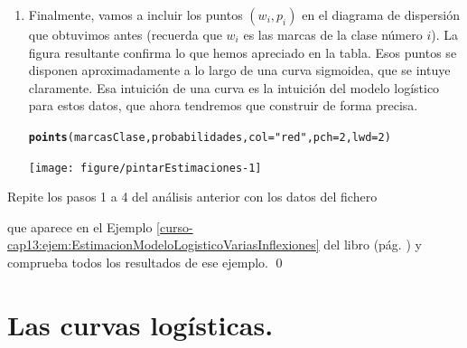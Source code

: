 \documentclass[10pt,a4paper]{article}\usepackage[]{graphicx}\usepackage[]{color}
\makeatletter
\newcommand{\hlnum}[1]{\textcolor[rgb]{0.686,0.059,0.569}{#1}}%
\newcommand{\hlstr}[1]{\textcolor[rgb]{0.192,0.494,0.8}{#1}}%
\newcommand{\hlstd}[1]{\textcolor[rgb]{0.345,0.345,0.345}{#1}}%
\newcommand{\hlkwc}[1]{\textcolor[rgb]{0.333,0.667,0.333}{#1}}%
\newcommand{\hlkwd}[1]{\textcolor[rgb]{0.737,0.353,0.396}{\textbf{#1}}}%
\newenvironment{kframe}{%
 \def\at@end@of@kframe{}%
 \ifinner\ifhmode%
  \def\at@end@of@kframe{\end{minipage}}%
  \begin{minipage}{\columnwidth}%
 \fi\fi%
 \def\FrameCommand##1{\hskip\@totalleftmargin \hskip-\fboxsep
 \colorbox{shadecolor}{##1}\hskip-\fboxsep
     \hskip-\linewidth \hskip-\@totalleftmargin \hskip\columnwidth}%
 \MakeFramed {\advance\hsize-\width
   \@totalleftmargin\z@ \linewidth\hsize
   \@setminipage}}%
 {\par\unskip\endMakeFramed%
 \at@end@of@kframe}
\newenvironment{knitrout}{}{} %
\makeatother
\begin{document}
\begin{enumerate}
\item Finalmente, vamos a incluir los puntos $(w_i, p_i)$ en el diagrama de dispersión que obtuvimos antes (recuerda que $w_i$ es las marcas de la clase número $i$). La figura resultante confirma lo que hemos apreciado en la tabla. Esos puntos se disponen aproximadamente a lo largo de una curva sigmoidea, que se intuye claramente. Esa intuición de una curva es la intuición del modelo logístico para estos datos, que ahora tendremos que construir de forma precisa.

\begin{knitrout}
\color{fgcolor}\begin{kframe}
\begin{alltt}
\hlkwd{points}\hlstd{(marcasClase, probabilidades,} \hlkwc{col}\hlstd{=}\hlstr{"red"}\hlstd{,} \hlkwc{pch}\hlstd{=}\hlnum{2}\hlstd{,} \hlkwc{lwd}\hlstd{=}\hlnum{2}\hlstd{)}
\end{alltt}
\end{kframe}

{\centering \texttt{[image: figure/pintarEstimaciones-1]} 

}



\end{knitrout}

\end{enumerate}


\begin{ejercicio}
\label{tut13:ejercicio03}
Repite los pasos 1 a 4 del análisis anterior con los datos del fichero
\begin{center}
\end{center}
que aparece en el Ejemplo \ref{curso-cap13:ejem:EstimacionModeloLogisticoVariasInflexiones} del libro (pág. \pageref{curso-cap13:ejem:EstimacionModeloLogisticoVariasInflexiones}) y comprueba todos los resultados de ese ejemplo.
\qed
\end{ejercicio}


\section{Las curvas logísticas.}
\label{tut13:subsec:CurvasLogisticas}
\end{document}
